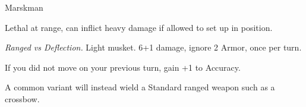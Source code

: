 \begin{monsterboxbg}{Marskman}

    Lethal at range, can inflict heavy damage if allowed to set up in position.
    
    \rpghline
    \stats[
        STR = \stat{12}, 
        DEX = \stat{10},
        CON = \stat{12},
        INT = \stat{8},
        WIS = \stat{15},
        CHA = \stat{10},
    ]
    \rpghline

    \basics[
    armorclass = 1,
    hitpoints  = 18,
    focus      = 5,
    defenses   = {Deflection 2, Reflex 2, Fortitude 2, Will -1}
    ]
    \rpghline

    \details[%
    skills = {Discretion 2},
    accuracies = {Melee 0, Ranged 5},
    ]
    \rpghline%
    

    \begin{rpg-monsteraction}
        \textit{Ranged vs Deflection.} Light musket. 6+1 damage, ignore 2 Armor, once per turn.
    \end{rpg-monsteraction}

    \begin{rpg-monsteraction}
    \end{rpg-monsteraction}


    \begin{rpg-monsteraction}[Zeroing In]
        If you did not move on your previous turn, gain +1 to Accuracy.
    \end{rpg-monsteraction}


    A common variant will instead wield a Standard ranged weapon such as a crossbow.

\end{monsterboxbg}
            





